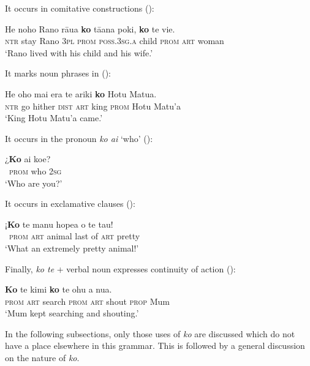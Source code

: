 It occurs in comitative constructions ():

\ea\label{ex:4.315}
\gll He noho Rano rāua \textbf{ko} tā{\ꞌ}ana poki, \textbf{ko} te vi{\ꞌ}e.\\
\textsc{ntr} stay Rano \textsc{3pl} \textsc{prom} \textsc{poss.3sg.a} child \textsc{prom} \textsc{art} woman\\

\glt
‘Rano lived with his child and his wife.’ \textstyleExampleref{[Mtx-7-18.001]}
\z

It marks noun phrases in  ():

\ea\label{ex:4.316}
\gll He oho mai era te {\ꞌ}ariki \textbf{ko} Hotu Matu{\ꞌ}a. \\
\textsc{ntr} go hither \textsc{dist} \textsc{art} king \textsc{prom} Hotu Matu’a \\

\glt
‘King Hotu Matu’a came.’ \textstyleExampleref{[Mtx-2-02.043]}
\z

It occurs in the  pronoun \textit{ko ai} ‘who’ ():

\ea\label{ex:4.317}
\gll ¿\textbf{Ko} ai koe? \\
~\textsc{prom} who \textsc{2sg} \\

\glt
‘Who are you?’ \textstyleExampleref{[R304.097]} 
\z

It occurs in exclamative clauses ():

\ea\label{ex:4.318}
\gll ¡\textbf{Ko} te manu hope{\ꞌ}a o te tau! \\
~\textsc{prom} \textsc{art} animal last of \textsc{art} pretty \\

\glt
‘What an extremely pretty animal!’ \textstyleExampleref{[R345.072]} 
\z

Finally, \textit{ko te} + verbal noun expresses continuity of action ():

\ea\label{ex:4.319}
\gll \textbf{Ko} te kimi \textbf{ko} te ohu a nua. \\
\textsc{prom} \textsc{art} search \textsc{prom} \textsc{art} shout \textsc{prop} Mum \\

\glt
‘Mum kept searching and shouting.’ \textstyleExampleref{[R236.082]} 
\z

In the following subsections, only those uses of \textit{ko} are discussed which do not have a place elsewhere in this grammar. This is followed by a general discussion on the nature of \textit{ko}.

